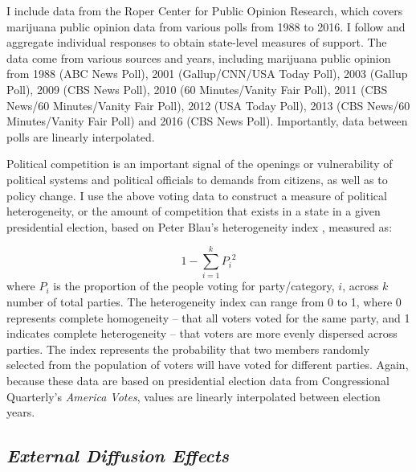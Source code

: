 I include data from the Roper Center for Public Opinion Research, which covers marijuana public opinion data from various polls from 1988 to 2016. I follow \citep{weakliem_and_biggert_1999} and aggregate individual responses to obtain state-level measures of support. The data come from various sources and years, including marijuana public opinion from 1988 (ABC News Poll), 2001 (Gallup/CNN/USA Today Poll), 2003 (Gallup Poll), 2009 (CBS News Poll), 2010 (60 Minutes/Vanity Fair Poll), 2011 (CBS News/60 Minutes/Vanity Fair Poll), 2012 (USA Today Poll), 2013 (CBS News/60 Minutes/Vanity Fair Poll) and 2016 (CBS News Poll). Importantly, data between polls are linearly interpolated. 


Political competition is an important signal of the openings or vulnerability of political systems and political officials to demands from citizens, as well as to policy change. I use the above voting data to construct a measure of political heterogeneity, or the amount of competition that exists in a state in a given presidential election, based on Peter Blau's heterogeneity index \citep{blau_1977a}, measured as:

\begin{equation}
1 - \sum_{i = 1}^{k}{P_{i}}^2
\end{equation}
where $P_{i}$ is the proportion of the people voting for party/category, $i$, across $k$ number of total parties. The heterogeneity index can range from 0 to 1, where 0 represents complete homogeneity -- that all voters voted for the same party, and 1 indicates complete heterogeneity -- that voters are more evenly dispersed across parties. The index represents the probability that two members randomly selected from the population of voters will have voted for different parties. Again, because these data are based on presidential election data from Congressional Quarterly's {\it{America Votes}}, values are linearly interpolated between election years.

\subsection{\it{External Diffusion Effects}}

